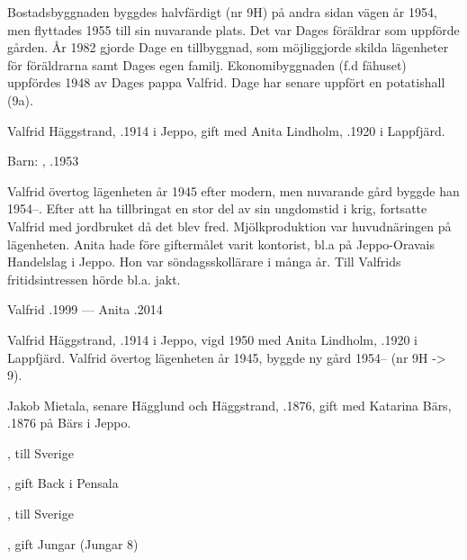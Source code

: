 Bostadsbyggnaden byggdes halvfärdigt (nr 9H) på andra sidan vägen år 1954, men flyttades 1955 till sin nuvarande plats. Det var Dages föräldrar som uppförde gården. År 1982 gjorde Dage en tillbyggnad, som möjliggjorde skilda lägenheter för föräldrarna samt Dages egen familj. Ekonomibyggnaden (f.d fähuset) uppfördes 1948 av Dages pappa Valfrid. Dage har senare uppfört en potatishall (9a).


%
Valfrid Häggstrand, .1914 i Jeppo, gift med Anita Lindholm, .1920 i Lappfjärd.

Barn: , .1953

Valfrid övertog lägenheten år 1945 efter modern, men nuvarande gård byggde han 1954--. Efter att ha tillbringat en stor del av sin ungdomstid i krig, fortsatte Valfrid med jordbruket då det blev fred. Mjölkproduktion var huvudnäringen på lägenheten. Anita hade före giftermålet varit kontorist, bl.a på Jeppo-Oravais Handelslag i Jeppo. Hon var söndagsskollärare i många år. Till Valfrids fritidsintressen hörde bl.a. jakt.

Valfrid .1999  ---  Anita .2014


%

%
Valfrid Häggstrand, .1914 i Jeppo, vigd 1950 med Anita Lindholm, .1920 i Lappfjärd. Valfrid övertog lägenheten år 1945, byggde ny gård 1954-- (nr 9H -> 9).\jhvspace{}


%
Jakob Mietala, senare Hägglund och Häggstrand, .1876, gift med Katarina Bärs, .1876 på Bärs i Jeppo.
\begin{jhchildren}
  \item {}
  \item {}, till Sverige
  \item {}
  \item {}, gift Back i Pensala
  \item {}, till Sverige
  \item {}, gift Jungar (Jungar 8)
  \item {}
  \item {}
\end{jhchildren}

